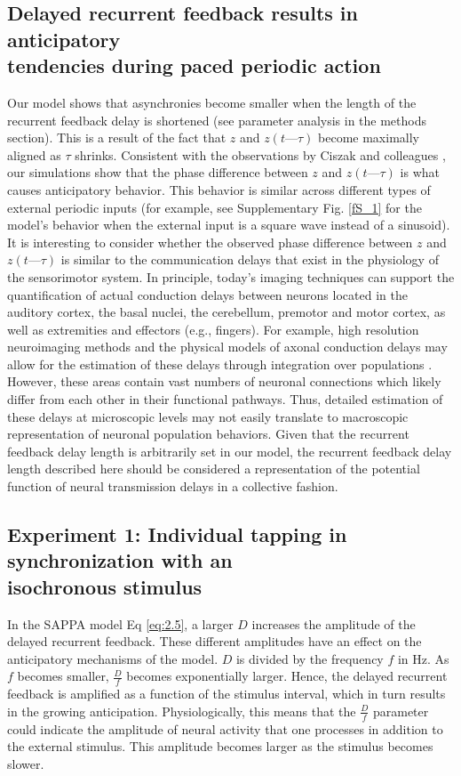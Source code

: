 \documentclass{report}
\begin{document}
\subsection{Delayed recurrent feedback results in anticipatory \\ tendencies during paced periodic action}

Our model shows that asynchronies become smaller when the length of the recurrent feedback delay is shortened (see parameter analysis in the methods section). This is a result of the fact that $z$ and $z(t—\tau)$ become maximally aligned as $\tau$ shrinks. Consistent with the observations by Ciszak and colleagues \cite{ciszak2004dynamical}, our simulations show that the phase difference between $z$ and $z(t—\tau)$ is what causes anticipatory behavior. This behavior is similar across different types of external periodic inputs (for example, see Supplementary Fig.{} \ref{fS_1} for the model's behavior when the external input is a square wave instead of a sinusoid). It is interesting to consider whether the observed phase difference between $z$ and $z(t—\tau)$ is similar to the communication delays that exist in the physiology of the sensorimotor system. In principle, today's imaging techniques can support the quantification of actual conduction delays between neurons located in the auditory cortex, the basal nuclei, the cerebellum, premotor and motor cortex, as well as extremities and effectors (e.g., fingers). For example, high resolution neuroimaging methods and the physical models of axonal conduction delays may allow for the estimation of these delays through integration over populations \cite{swadlow2012axonal}. However, these areas contain vast numbers of neuronal connections which likely differ from each other in their functional pathways. Thus, detailed estimation of these delays at microscopic levels may not easily translate to macroscopic representation of neuronal population behaviors. Given that the recurrent feedback delay length is arbitrarily set in our model, the recurrent feedback delay length described here should be considered a representation of the potential function of neural transmission delays in a collective fashion.

\subsection{Experiment 1: Individual tapping in synchronization with an \\ isochronous stimulus}

In the SAPPA model Eq \eqref{eq:2.5}, a larger $D$ increases the amplitude of the delayed recurrent feedback. These different amplitudes have an effect on the anticipatory mechanisms of the model. $D$ is divided by the frequency $f$ in Hz. As $f$ becomes smaller, $\frac{D}{f}$ becomes exponentially larger. Hence, the delayed recurrent feedback is amplified as a function of the stimulus interval, which in turn results in the growing anticipation. Physiologically, this means that the $\frac{D}{f}$ parameter could indicate the amplitude of neural activity that one processes in addition to the external stimulus. This amplitude becomes larger as the stimulus becomes slower.
\end{document}
